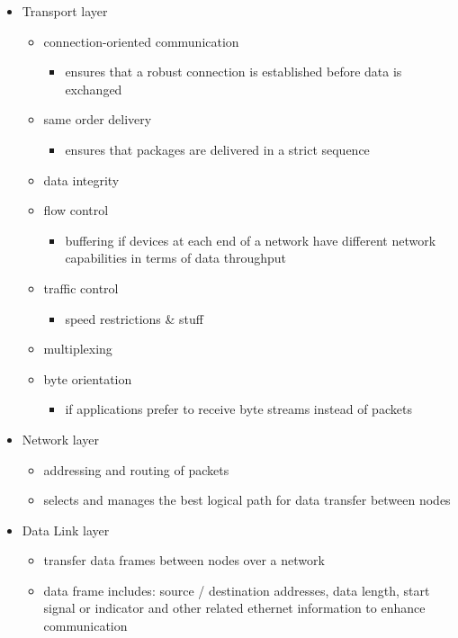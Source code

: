 \documentclass[a4paper,12pt]{article}
\begin{document}
\begin{itemize}
	\item Transport layer
	\begin{itemize}
		\item  connection-oriented communication
		\begin{itemize}
			\item ensures that a robust connection is established before data is exchanged
		\end{itemize}
		\item  same order delivery
		\begin{itemize}
			\item  ensures that packages are delivered in a strict sequence
		\end{itemize}
		\item  data integrity
		\item  flow control
		\begin{itemize}
			\item  buffering if devices at each end of a network have different network capabilities in terms of data throughput 
		\end{itemize}	
		\item  traffic control
		\begin{itemize}
			\item  speed restrictions \& stuff
		\end{itemize}	
		\item  multiplexing
		\item  byte orientation
		\begin{itemize}
			\item if applications prefer to receive byte streams instead of packets 
		\end{itemize}  
	\end{itemize}

	\item Network layer
	\begin{itemize}
		\item  addressing and routing of packets
		\item  selects and manages the best logical path for data transfer between nodes
	\end{itemize}

	\item Data Link layer
	\begin{itemize}
		\item  transfer data frames between nodes over a network
		\item  data frame includes: source / destination addresses, data length, start signal or indicator and other related ethernet information to enhance communication		 
	\end{itemize}


\end{itemize}
\end{document}
